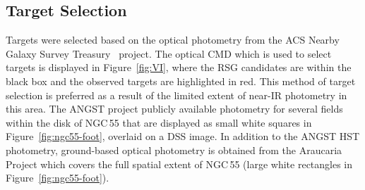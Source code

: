 \subsection{Target Selection} %
\label{sub:target_selection}




Targets were selected based on the optical photometry from the ACS Nearby Galaxy Survey Treasury~\citep[blue; ANGST][]{2009ApJS..183...67D} project.
The optical CMD which is used to select targets is displayed in Figure~\ref{fig:VI}, where the RSG candidates are within the black box and the observed targets are highlighted in red.
This method of target selection is preferred as a result of the limited extent of near-IR photometry in this area.
The ANGST project publicly available photometry for several fields within the disk of NGC\,55 that are displayed as small white squares in Figure~\ref{fig:ngc55-foot}, overlaid on a DSS image.
In addition to the ANGST HST photometry, ground-based optical photometry is obtained from the Araucaria Project which covers the full spatial extent of NGC\,55 (large white rectangles in Figure~\ref{fig:ngc55-foot}).

